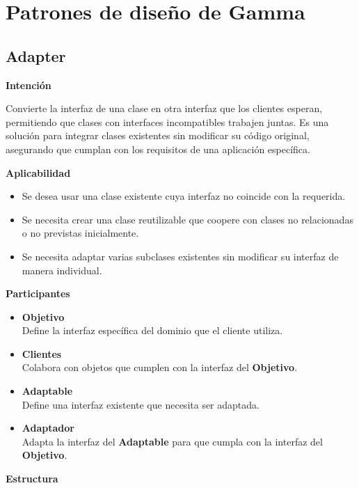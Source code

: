 

\chapter{Patrones de diseño de Gamma}

\section{Adapter}

\textbf{Intención}

Convierte la interfaz de una clase en otra interfaz que los clientes esperan, permitiendo que clases con interfaces incompatibles trabajen juntas. Es una solución para integrar clases existentes sin modificar su código original, asegurando que cumplan con los requisitos de una aplicación específica.

\textbf{Aplicabilidad}

\begin{itemize}
\item Se desea usar una clase existente cuya interfaz no coincide con la requerida.
\item Se necesita crear una clase reutilizable que coopere con clases no relacionadas o no previstas inicialmente.
\item Se necesita adaptar varias subclases existentes sin modificar su interfaz de manera individual.
\end{itemize}


\textbf{Participantes}

\begin{itemize}
\item \textbf{Objetivo}\\
Define la interfaz específica del dominio que el cliente utiliza.
\item \textbf{Clientes}\\
Colabora con objetos que cumplen con la interfaz del \textbf{Objetivo}.
\item \textbf{Adaptable}\\
Define una interfaz existente que necesita ser adaptada.
\item \textbf{Adaptador}\\
Adapta la interfaz del \textbf{Adaptable} para que cumpla con la interfaz del \textbf{Objetivo}.
\end{itemize}

\textbf{Estructura}

